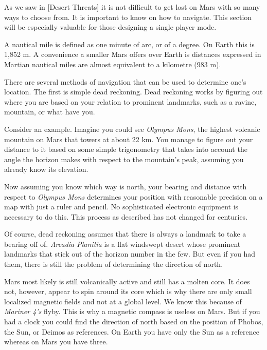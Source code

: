 

As we saw in [Desert Threats] it is not difficult to get lost on Mars with so many ways to choose from. It is important to know on how to navigate. This section will be especially valuable for those designing a single player mode.

A nautical mile is defined as one minute of arc, or  of a degree. On Earth this is 1,852 m. A convenience a smaller Mars offers over Earth is distances expressed in Martian nautical miles are almost equivalent to a kilometre (983 m).

There are several methods of navigation that can be used to determine one's location. The first is simple dead reckoning. Dead reckoning works by figuring out where you are based on your relation to prominent landmarks, such as a ravine, mountain, or what have you. 

Consider an example. Imagine you could see {\it Olympus Mons}, the highest volcanic mountain on Mars that towers at about 22 km. You manage to figure out your distance to it based on some simple trigonometry that takes into account the angle the horizon makes with respect to the mountain's peak, assuming you already know its elevation. 

Now assuming you know which way is north, your bearing and distance with respect to {\it Olympus Mons} determines your position with reasonable precision on a map with just a ruler and pencil. No sophisticated electronic equipment is necessary to do this. This process as described has not changed for centuries.

Of course, dead reckoning assumes that there is always a landmark to take a bearing off of. {\it Arcadia Planitia} is a flat windswept desert whose prominent landmarks that stick out of the horizon number in the few. But even if you had them, there is still the problem of determining the direction of north. 

Mars most likely is still volcanically active and still has a molten core. It does not, however, appear to spin around its core which is why there are only small localized magnetic fields and not at a global level. We know this because of {\it Mariner 4's} flyby. This is why a magnetic compass is useless on Mars. But if you had a clock you could find the direction of north based on the position of Phobos, the Sun, or Deimos as references. On Earth you have only the Sun as a reference whereas on Mars you have three.

